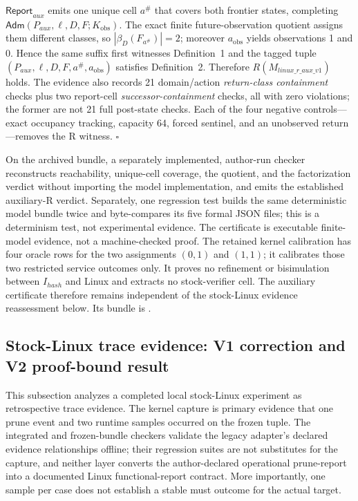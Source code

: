 \documentclass[conference]{IEEEtran}
\begin{document}
$\mathsf{Report}_{\mathit{aux}}$ emits one unique cell $a^\#$ that covers both frontier states, completing $\mathsf{Adm}(P_{\mathit{aux}},\ell,D,F;K_{\mathrm{obs}})$. The exact finite future-observation quotient assigns them different classes, so $|\beta_D(F_{a^\#})|=2$; moreover $a_{\mathrm{obs}}$ yields observations 1 and 0. Hence the same suffix first witnesses Definition~1 and the tagged tuple $(P_{\mathit{aux}},\ell,D,F,a^\#,a_{\mathrm{obs}})$ satisfies Definition~2. Therefore $R(M_{\mathit{linux\_r\_aux\_v1}})$ holds. The evidence also records 21 domain/action \emph{return-class containment} checks plus two report-cell \emph{successor-containment} checks, all with zero violations; the former are not 21 full post-state checks. Each of the four negative controls---exact occupancy tracking, capacity 64, forced sentinel, and an unobserved return---removes the R witness. \hfill$\square$

On the archived bundle, a separately implemented, author-run checker reconstructs reachability, unique-cell coverage, the quotient, and the factorization verdict without importing the model implementation, and emits the established auxiliary-R verdict. Separately, one regression test builds the same deterministic model bundle twice and byte-compares its five formal JSON files; this is a determinism test, not experimental evidence. The certificate is executable finite-model evidence, not a machine-checked proof. The retained kernel calibration has four oracle rows for the two assignments $(0,1)$ and $(1,1)$; it calibrates those two restricted service outcomes only. It proves no refinement or bisimulation between $I_{\mathit{hash}}$ and Linux and extracts no stock-verifier cell. The auxiliary certificate therefore remains independent of the stock-Linux evidence reassessment below. Its bundle is .

\subsection{Stock-Linux trace evidence: V1 correction and V2 proof-bound result}

This subsection analyzes a completed local stock-Linux experiment as retrospective trace evidence. The kernel capture is primary evidence that one prune event and two runtime samples occurred on the frozen tuple. The integrated and frozen-bundle checkers validate the legacy adapter's declared evidence relationships offline; their regression suites are not substitutes for the capture, and neither layer converts the author-declared operational prune-report into a documented Linux functional-report contract. More importantly, one sample per case does not establish a stable must outcome for the actual target.
\end{document}
